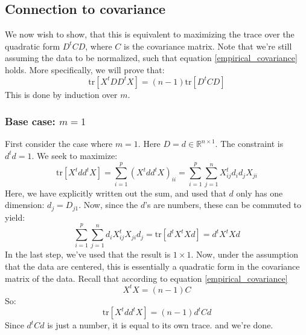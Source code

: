 \documentclass[12pt, a4paper]{article}
\numberwithin{equation}{section}
\begin{document}
\subsection{Connection to covariance}
We now wish to show, that this is equivalent to maximizing the trace over the quadratic form $D^t CD$, where $C$ is the covariance matrix. Note that we're still assuming the data to be normalized, such that equation \ref{empirical_covariance} holds. More specifically, we will prove that:
\begin{equation}
\textrm{tr}[X^t DD^t X]=(n-1)\textrm{tr}[D^t CD]
\end{equation}
This is done by induction over $m$.

\subsubsection{Base case: $m=1$}
First consider the case where $m=1$. Here $D=d\in\mathbb{R}^{n\times 1}$. The constraint is $d^t d=1$. We seek to maximize:
\begin{equation}
\textrm{tr}[X^t dd^t X]=\sum_{i=1}^p(X^t dd^t X)_{ii}=\sum_{i=1}^p\sum_{j=1}^n X^t_{ij}d_i d_j X_{ji}
\end{equation}
Here, we have explicitly written out the sum, and used that $d$ only has one dimension: $d_j=D_{j1}$. Now, since the $d$'s are numbers, these can be commuted to yield:
\begin{equation}
\sum_{i=1}^p\sum_{j=1}^n d_i X^t_{ij} X_{ji} d_j=\textrm{tr}[d^t X^t Xd]=d^t X^t Xd
\end{equation}
In the last step, we've used that the result is $1\times 1$. Now, under the assumption that the data are centered, this is essentially a quadratic form in the covariance matrix of the data. Recall that according to equation \ref{empirical_covariance}
\begin{equation}
X^t X=(n-1)C
\end{equation}
So:
\begin{equation}
\textrm{tr}[X^t dd^t X]=(n-1)d^t Cd
\end{equation}
Since $d^t Cd$ is just a number, it is equal to its own trace. and we're done.
\end{document}
